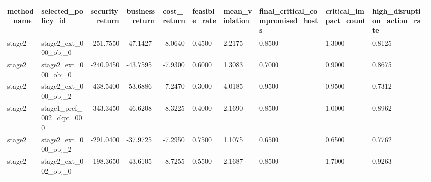 \begin{tabular}{llllllllll}
\hline
method_name & selected_policy_id & security_return & business_return & cost_return & feasible_rate & mean_violation & final_critical_compromised_hosts & critical_impact_count & high_disruption_action_rate \\
\hline
stage2 & stage2_ext_000_obj_0 & -251.7550 & -47.1427 & -8.0640 & 0.4500 & 2.2175 & 0.8500 & 1.3000 & 0.8125 \\
stage2 & stage2_ext_000_obj_0 & -240.9450 & -43.7595 & -7.9300 & 0.6000 & 1.3083 & 0.7000 & 0.9000 & 0.8675 \\
stage2 & stage2_ext_000_obj_2 & -438.5400 & -53.6886 & -7.2470 & 0.3000 & 4.0185 & 0.9500 & 0.9500 & 0.7312 \\
stage2 & stage1_pref_002_ckpt_000 & -343.3450 & -46.6208 & -8.3225 & 0.4000 & 2.1690 & 0.8500 & 1.0000 & 0.8962 \\
stage2 & stage2_ext_000_obj_2 & -291.0400 & -37.9725 & -7.2950 & 0.7500 & 1.1075 & 0.6500 & 0.6500 & 0.7762 \\
stage2 & stage2_ext_002_obj_0 & -198.3650 & -43.6105 & -8.7255 & 0.5500 & 2.1687 & 0.8500 & 1.7000 & 0.9263 \\
\hline
\end{tabular}